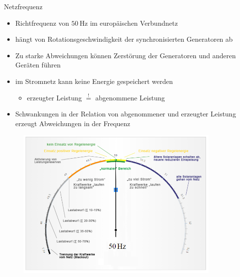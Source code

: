 \documentclass[aspectratio=1610, professionalfonts, 9pt]{beamer}
\begin{document}
\begin{frame}{Netzfrequenz}
\begin{itemize}%
\item Richtfrequenz von $\SI{50}{\hertz}$ im europäischen Verbundnetz
\item hängt von Rotationsgeschwindigkeit der synchronisierten Generatoren
ab
\item Zu starke Abweichungen können Zerstörung der Generatoren und anderen Geräten führen
\item im Stromnetz kann keine Energie gespeichert werden
  \begin{itemize}
    \item[\rightarrow]  erzeugter Leistung $\stackrel{!}{=}$ abgenommene Leistung
  \end{itemize}
  \item Schwankungen in der Relation von abgenommener
  und erzeugter Leistung erzeugt Abweichungen in der Frequenz
\end{itemize}
\end{frame}

{
\begin{frame}
  \begin{figure}
  \includegraphics[width=0.9\textwidth]{images/Frequenz.png}
  \end{figure}
\end{frame}
}
\end{document}
